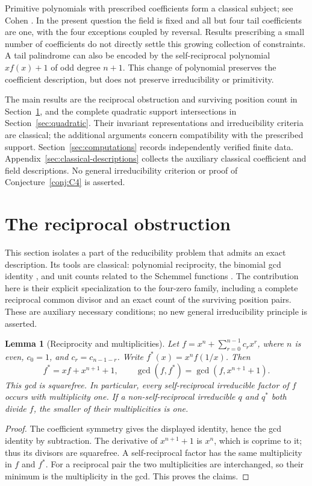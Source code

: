 \documentclass[11pt]{article}
\newtheorem{lemma}[proposition]{Lemma}
\theoremstyle{definition}
\theoremstyle{remark}
\begin{document}
Primitive polynomials with prescribed coefficients form a classical
subject; see Cohen \cite{Coh06}. In the present question the field
is fixed and all but four tail coefficients are one, with the four
exceptions coupled by reversal. Results prescribing a small number
of coefficients do not directly settle this growing collection of
constraints. A tail palindrome can also be encoded by the
self-reciprocal polynomial $xf(x)+1$ of odd degree $n+1$.
This change of polynomial preserves the coefficient description,
but does not preserve irreducibility or primitivity.

The main results are the reciprocal obstruction and surviving position
count in Section~\ref{sec:reciprocal-screen}, and the complete
quadratic support intersections in Section~\ref{sec:quadratic}.
Their invariant representations and irreducibility criteria are classical;
the additional arguments concern compatibility with the prescribed support.
Section~\ref{sec:computations} records independently verified finite data.
Appendix~\ref{sec:classical-descriptions} collects the auxiliary classical
coefficient and field descriptions. No general irreducibility criterion
or proof of Conjecture~\ref{conj:C4} is asserted.

\section{The reciprocal obstruction}
\label{sec:reciprocal-screen}

This section isolates a part of the reducibility problem that admits
an exact description. Its tools are classical: polynomial reciprocity,
the binomial gcd identity \cite{LN}, and unit counts related to the
Schemmel functions \cite{Def20}. The contribution here is their explicit
specialization to the four-zero family, including a complete reciprocal
common divisor and an exact count of the surviving position pairs.
These are auxiliary necessary conditions; no new general irreducibility
principle is asserted.

\begin{lemma}[Reciprocity and multiplicities]
\label{lem:reciprocal-multiplicity}
Let \(f=x^n+\sum_{r=0}^{n-1}c_rx^r\), where \(n\) is even,
\(c_0=1\), and \(c_r=c_{n-1-r}\). Write
\(f^*(x)=x^nf(1/x)\). Then
\[
 f^*=xf+x^{n+1}+1,\qquad
 \gcd(f,f^*)=\gcd(f,x^{n+1}+1).
\]
This gcd is squarefree. In particular, every self-reciprocal
irreducible factor of \(f\) occurs with multiplicity one. If a
non-self-reciprocal irreducible \(q\) and \(q^*\) both divide \(f\),
the smaller of their multiplicities is one.
\end{lemma}
\begin{proof}
The coefficient symmetry gives the displayed identity, hence the gcd
identity by subtraction. The derivative of \(x^{n+1}+1\) is \(x^n\),
which is coprime to it; thus its divisors are squarefree. A
self-reciprocal factor has the same multiplicity in \(f\) and \(f^*\).
For a reciprocal pair the two multiplicities are interchanged, so
their minimum is the multiplicity in the gcd. This proves the claims.
\end{proof}
\end{document}
